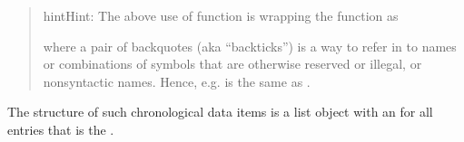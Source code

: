 \documentclass[a4paper,12pt,english]{sphinxhowto}
\begin{document}
\label{\detokenize{EDHVariables:recursively-apply}}\begin{quote}

\begin{sphinxadmonition}{hint}{Hint:}
The above use of function  is wrapping the   function as

\begin{sphinxVerbatim}[commandchars=\\\{\},formatcom=\footnotesize]
  \PYG{n}{`[`}   
\end{sphinxVerbatim}

where a pair of backquotes (aka “backticks”) is a way to refer in  to names or combinations
of symbols that are otherwise reserved or illegal, or non\sphinxhyphen{}syntactic names.
Hence, e.g. \sphinxcode{\sphinxupquote{apply(foo, \textasciigrave{}{[}\textasciigrave{}, c(...) )}} is the same as .
\end{sphinxadmonition}
\end{quote}


The structure of such chronological data items is a list object with an  for all entries that is the  .
\begin{quote}

\begin{sphinxVerbatim}[commandchars=\\\{\},formatcom=\footnotesize]
  
\end{sphinxVerbatim}
\end{quote}
\end{document}
